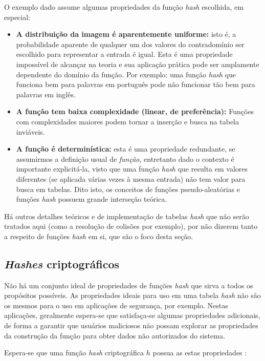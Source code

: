 O exemplo dado assume algumas propriedades da função \emph{hash} escolhida, em especial:
\begin{itemize}
  \item \textbf{A distribuição da imagem é aparentemente uniforme:} isto é, a probabilidade aparente de qualquer um dos valores do contradomínio ser escolhido para representar a entrada é igual. Esta é uma propriedade impossível de alcançar na teoria e sua aplicação prática pode ser amplamente dependente do domínio da função. Por exemplo: uma função \emph{hash} que funciona bem para palavras em português pode não funcionar tão bem para palavras em inglês.
  
  \item \textbf{A função tem baixa complexidade (linear, de preferência):} Funções com complexidades maiores podem tornar a inserção e busca na tabela inviáveis.
  
  \item \textbf{A função é determinística:} esta é uma propriedade redundante, se assumirmos a definição usual de \emph{função}, entretanto dado o contexto é importante explicitá-la, visto que uma função \emph{hash} que resulta em valores diferentes (se aplicada várias vezes à mesma entrada) não tem valor para busca em tabelas. Dito isto, os conceitos de funções pseudo-aleatórias e funções \emph{hash} possuem grande interseção teórica.
\end{itemize}

Há outros detalhes teóricos e de implementação de tabelas \emph{hash} que não serão tratados aqui (como a resolução de colisões por exemplo), por não dizerem tanto a respeito de funções \emph{hash} em si, que são o foco desta seção.

\subsection{\emph{Hashes} criptográficos}\label{sec:hashcripto}

Não há um conjunto ideal de propriedades de funções \emph{hash} que sirva a todos os propósitos possíveis. As propriedades ideais para uso em uma tabela \emph{hash} não são os mesmos para o uso em aplicações de segurança, por exemplo. Nestas aplicações, geralmente espera-se que satisfaça-se algumas propriedades adicionais, de forma a garantir que usuários maliciosos não possam explorar as propriedades da construção da função para obter dados não autorizados do sistema.

Espera-se que uma função \emph{hash} criptográfica $h$ possua as estas propriedades \cite{katz2014introduction}:


